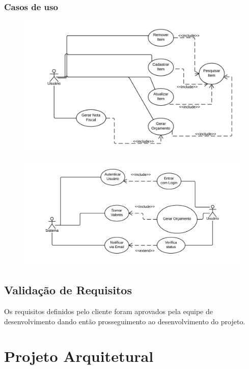 \documentclass[a4paper,10pt]{article}
\begin{document}
\subsubsection{Casos de uso}

\begin{figure}[H]
\centering
\includegraphics[width=1\textwidth]{pic/casos_de_uso_1.png}
\end{figure}

\begin{figure}[H]
\centering
\includegraphics[width=1\textwidth]{pic/casos_de_uso_2.png}
\end{figure}

\subsection{Validação de Requisitos}

Os requisitos definidos pelo cliente foram aprovados pela equipe de desenvolvimento dando então prosseguimento ao desenvolvimento do projeto.

\section{Projeto Arquitetural}
\end{document}
